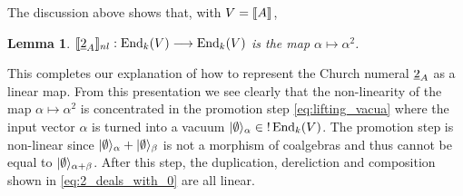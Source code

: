 \documentclass[english,letter paper,12pt,reqno]{article}
\DeclarePairedDelimiter\ket{\lvert}{\rangle}
\newtheorem{lemma}[theorem]{Lemma}
\theoremstyle{example}
\def\vacu{\ket{\emptyset}}
\DeclareMathOperator{\End}{End}
\begin{document}
The discussion above shows that, with $V = \llbracket A \rrbracket$,

\begin{lemma}\label{lemma:nonlinear_recover} $\den{\church{2}_A}_{nl}: \End_k(V) \lto \End_k(V)$ is the map $\alpha \mapsto \alpha^2$.
\end{lemma}

This completes our explanation of how to represent the Church numeral $\underline{2}_A$ as a linear map. From this presentation we see clearly that the non-linearity of the map $\alpha \mapsto \alpha^2$ is concentrated in the promotion step \eqref{eq:lifting_vacua} where the input vector $\alpha$ is turned into a vacuum $\vacu_\alpha \in {!} \End_k(V)$. The promotion step is non-linear since $\vacu_\alpha + \vacu_\beta$ is not a morphism of coalgebras and thus cannot be equal to $\vacu_{\alpha + \beta}$. After this step, the duplication, dereliction and composition shown in \eqref{eq:2_deals_with_0} are all linear. %

\end{document}
